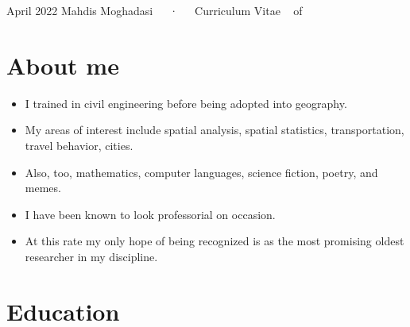 \documentclass[11pt,a4paper,]{awesome-cv}
\providecommand{\tightlist}{%
	\setlength{\itemsep}{0pt}\setlength{\parskip}{0pt}}
\begin{document}
\makecvheader

\makecvfooter
  {April 2022}
    {Mahdis Moghadasi~~~·~~~Curriculum Vitae}
  {\thepage~ of \pageref{LastPage}~}





\hypertarget{about-me}{%
\section{About me}\label{about-me}}

\begin{itemize}
\tightlist
\item
  I trained in civil engineering before being adopted into geography.
\item
  My areas of interest include spatial analysis, spatial statistics,
  transportation, travel behavior, cities.
\item
  Also, too, mathematics, computer languages, science fiction, poetry,
  and memes.
\item
  I have been known to look professorial on occasion.
\item
  At this rate my only hope of being recognized is as the most promising
  oldest researcher in my discipline.
\end{itemize}

\hypertarget{education}{%
\section{Education}\label{education}}

\begin{cventries}
    \vspace{-4.0mm}
\end{cventries}
\end{document}
